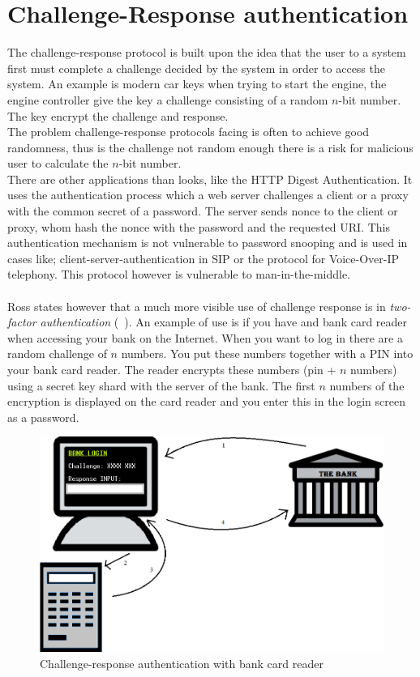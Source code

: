 \section{Challenge-Response authentication}\label{sec:challResp} 
The challenge-response protocol is built upon the idea that the user to a system first must complete a challenge decided by the system in order to access the system. An example is modern car keys when trying to start the engine, the engine controller give the key a challenge consisting of a random $n$-bit number. The key encrypt the challenge and response. \\
The problem challenge-response protocols facing is often to achieve good randomness, thus is the challenge not random enough there is a risk for malicious user to calculate the $n$-bit number. \\
There are other applications than looks, like the HTTP Digest Authentication. It uses the authentication process which a web server challenges a client or a proxy with the common secret of a password. The server sends nonce to the client or proxy, whom hash the nonce with the password and the requested URI. This authentication mechanism is not vulnerable to password snooping and is used in cases like; client-server-authentication in SIP or the protocol for Voice-Over-IP telephony. This protocol however is vulnerable to man-in-the-middle. \\
\\
Ross states however that a much more visible use of challenge response is in \textit{two-factor authentication} (~). An example of use is if you have and bank card reader when accessing your bank on the Internet. When you want to log in there are a random challenge of $n$ numbers. You put these numbers together with a PIN into your bank card reader. The reader encrypts these numbers (pin + $n$ numbers) using a secret key shard with the server of the bank. The first $n$ numbers of the encryption is displayed on the card reader and you enter this in the login screen as a password.
\newpage
\begin{figure}[h]
	\centering
    \includegraphics[scale=0.3]{img/challenge-response-bank}
    \caption{Challenge-response authentication with bank card reader}
  \label{fig:challengeResponse}
\end{figure}
